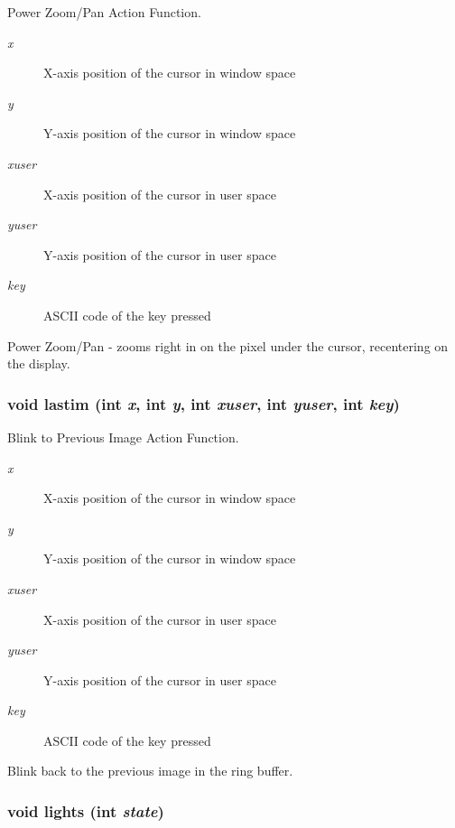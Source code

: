 Power Zoom/Pan Action Function. 

\begin{Desc}
\item[Parameters:]
\begin{description}
\item[{\em x}]X-axis position of the cursor in window space \item[{\em y}]Y-axis position of the cursor in window space \item[{\em xuser}]X-axis position of the cursor in user space \item[{\em yuser}]Y-axis position of the cursor in user space \item[{\em key}]ASCII code of the key pressed\end{description}
\end{Desc}
Power Zoom/Pan - zooms right in on the pixel under the cursor, recentering on the display. 
\subsubsection{\setlength{\rightskip}{0pt plus 5cm}void lastim (int {\em x}, int {\em y}, int {\em xuser}, int {\em yuser}, int {\em key})}\label{xtv_8h_a111}


Blink to Previous Image Action Function. 

\begin{Desc}
\item[Parameters:]
\begin{description}
\item[{\em x}]X-axis position of the cursor in window space \item[{\em y}]Y-axis position of the cursor in window space \item[{\em xuser}]X-axis position of the cursor in user space \item[{\em yuser}]Y-axis position of the cursor in user space \item[{\em key}]ASCII code of the key pressed\end{description}
\end{Desc}
Blink back to the previous image in the ring buffer. 
\subsubsection{\setlength{\rightskip}{0pt plus 5cm}void lights (int {\em state})}\label{xtv_8h_a80}


